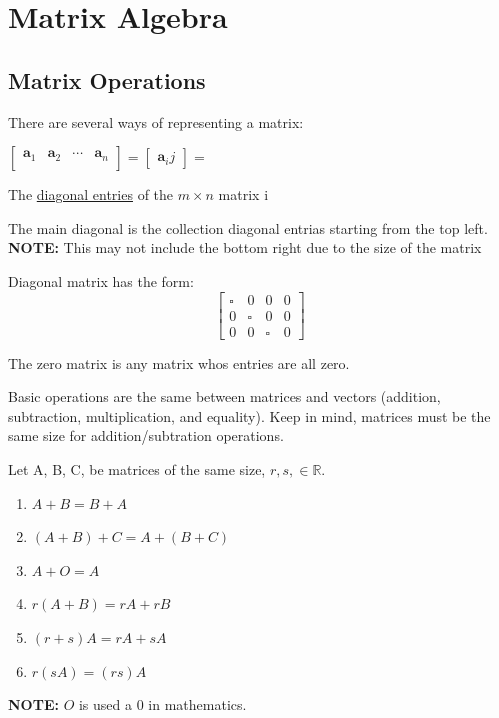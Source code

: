 \documentclass{report}
\begin{document}
\chapter{Matrix Algebra}
\section{Matrix Operations}
There are several ways of representing a matrix:\\
\begin{center}
$\begin{bmatrix}
\mathbf{a}_1 & \mathbf{a}_2 & \dotsb & \mathbf{a}_n \\ 
\end{bmatrix}
=
\begin{bmatrix}
\mathbf{a}_ij
\end{bmatrix}
=
$
\end{center}
\begin{definition}
The \underline{diagonal entries} of the $m \times n$ matrix i
\end{definition}

\begin{definition}
The main diagonal is the collection diagonal entrias starting from the top left. \textbf{NOTE:} This may not include the bottom right due to the size of the matrix
\end{definition}

\begin{definition}
Diagonal matrix has the form:
\begin{equation*}
	\begin{bmatrix}
	\square & 0 & 0 & 0 \\ 
	0 & \square & 0 & 0 \\ 
	0 & 0 & \square & 0
	\end{bmatrix}
\end{equation*}
\end{definition}

\begin{definition}
The zero matrix is any matrix whos entries are all zero.
\end{definition}

Basic operations are the same between matrices and vectors (addition, subtraction, multiplication, and equality). Keep in mind, matrices must be the same size for addition/subtration operations.

\begin{example}
Let A, B, C, be matrices of the same size, $r,s,\in \mathbb{R}$.
\begin{enumerate}
	\item $A+B = B+A$
	\item $(A + B) + C = A + (B + C)$
	\item $A + O = A$
	\item $r(A +B) = rA +rB$
	\item $(r +s)A = rA +sA$
	\item $r(sA) = (rs)A$
\end{enumerate}
\textbf{NOTE:} $O$ is used a 0 in mathematics.
\end{example}
\end{document}

